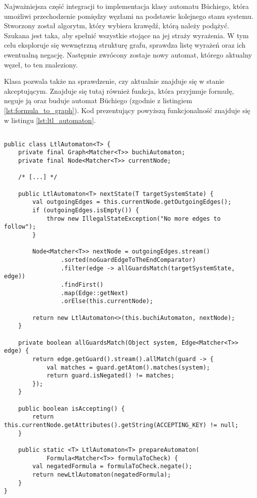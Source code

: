Najważniejsza część integracji to implementacja klasy automatu Büchiego, która umożliwi przechodzenie pomiędzy węzłami na podstawie kolejnego stanu systemu.
Stworzony został algorytm, który wybiera krawędź, którą należy podążyć.
Szukana jest taka, aby spełnić wszystkie stojące na jej straży wyrażenia.
W tym celu eksploruje się wewnętrzną strukturę grafu, sprawdza listę wyrażeń oraz ich ewentualną negację.
Następnie zwrócony zostaje nowy automat, którego aktualny węzeł, to ten znaleziony.

Klasa pozwala także na sprawdzenie, czy aktualnie znajduje się w stanie akceptującym.
Znajduje się tutaj również funkcja, która przyjmuje formułę, neguje ją oraz buduje automat Büchiego (zgodnie z listingiem \ref{lst:formula_to_graph}).
Kod prezentujący powyższą funkcjonalność znajduje się w listingu \ref{lst:ltl_automaton}.

\begin{minipage}{\linewidth}
\begin{lstlisting}[caption={Implementacja automatu Büchiego.},captionpos=b,label={lst:ltl_automaton}]

public class LtlAutomaton<T> {
    private final Graph<Matcher<T>> buchiAutomaton;
    private final Node<Matcher<T>> currentNode;

    /* [...] */

    public LtlAutomaton<T> nextState(T targetSystemState) {
        val outgoingEdges = this.currentNode.getOutgoingEdges();
        if (outgoingEdges.isEmpty()) {
            throw new IllegalStateException("No more edges to follow");
        }

        Node<Matcher<T>> nextNode = outgoingEdges.stream()
                .sorted(noGuardEdgeToTheEndComparator)
                .filter(edge -> allGuardsMatch(targetSystemState, edge))
                .findFirst()
                .map(Edge::getNext)
                .orElse(this.currentNode);

        return new LtlAutomaton<>(this.buchiAutomaton, nextNode);
    }

    private boolean allGuardsMatch(Object system, Edge<Matcher<T>> edge) {
        return edge.getGuard().stream().allMatch(guard -> {
            val matches = guard.getAtom().matches(system);
            return guard.isNegated() != matches;
        });
    }

    public boolean isAccepting() {
        return this.currentNode.getAttributes().getString(ACCEPTING_KEY) != null;
    }

    public static <T> LtlAutomaton<T> prepareAutomaton(
            Formula<Matcher<T>> formulaToCheck) {
        val negatedFormula = formulaToCheck.negate();
        return newLtlAutomaton(negatedFormula);
    }
}

\end{lstlisting}
\end{minipage}

